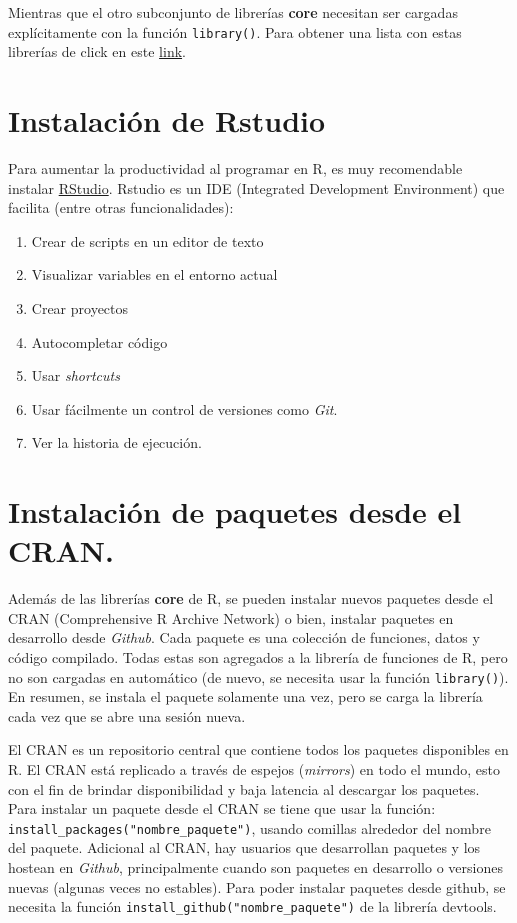 \documentclass[]{book}
\providecommand{\tightlist}{%
  \setlength{\itemsep}{0pt}\setlength{\parskip}{0pt}}
\begin{document}
Mientras que el otro subconjunto de librerías \textbf{core} necesitan ser cargadas explícitamente con la función \texttt{library()}. Para obtener una lista con estas librerías de click en este \href{https://stat.ethz.ch/R-manual/R-devel/doc/html/packages.html}{link}.

\hypertarget{instalaciuxf3n-de-rstudio}{%
\section{Instalación de Rstudio}\label{instalaciuxf3n-de-rstudio}}

Para aumentar la productividad al programar en R, es muy recomendable instalar \href{https://www.rstudio.com/products/rstudio/download/}{RStudio}. Rstudio es un IDE (Integrated Development Environment) que facilita (entre otras funcionalidades):

\begin{enumerate}
\def\labelenumi{\arabic{enumi}.}
\tightlist
\item
  Crear de scripts en un editor de texto
\item
  Visualizar variables en el entorno actual
\item
  Crear proyectos
\item
  Autocompletar código
\item
  Usar \emph{shortcuts}
\item
  Usar fácilmente un control de versiones como \emph{Git}.
\item
  Ver la historia de ejecución.
\end{enumerate}

\hypertarget{instalaciuxf3n-de-paquetes-desde-el-cran.}{%
\section{Instalación de paquetes desde el CRAN.}\label{instalaciuxf3n-de-paquetes-desde-el-cran.}}

Además de las librerías \textbf{core} de R, se pueden instalar nuevos paquetes desde el CRAN (Comprehensive R Archive Network) o bien, instalar paquetes en desarrollo desde \emph{Github}. Cada paquete es una colección de funciones, datos y código compilado. Todas estas son agregados a la librería de funciones de R, pero no son cargadas en automático (de nuevo, se necesita usar la función \texttt{library()}). En resumen, se instala el paquete solamente una vez, pero se carga la librería cada vez que se abre una sesión nueva.

El CRAN es un repositorio central que contiene todos los paquetes disponibles en R. El CRAN está replicado a través de espejos (\emph{mirrors}) en todo el mundo, esto con el fin de brindar disponibilidad y baja latencia al descargar los paquetes. Para instalar un paquete desde el CRAN se tiene que usar la función: \texttt{install\_packages("nombre\_paquete")}, usando comillas alrededor del nombre del paquete. Adicional al CRAN, hay usuarios que desarrollan paquetes y los hostean en \emph{Github}, principalmente cuando son paquetes en desarrollo o versiones nuevas (algunas veces no estables). Para poder instalar paquetes desde github, se necesita la función \texttt{install\_github("nombre\_paquete")} de la librería devtools.
\end{document}
